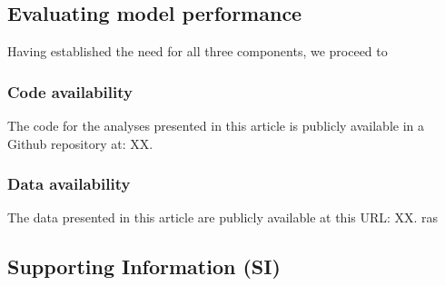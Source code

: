 \documentclass[9pt,twocolumn,twoside]{pnas-new}
\begin{document}

\subsection*{Evaluating model performance}
Having established the need for all three components, we proceed to


\subsubsection*{Code availability} The code for the analyses presented in this article is publicly available in a Github repository at: XX.

\subsubsection*{Data availability} The data presented in this article are publicly available at this URL: XX.
ras
\subsection*{Supporting Information (SI)}

\end{document}
